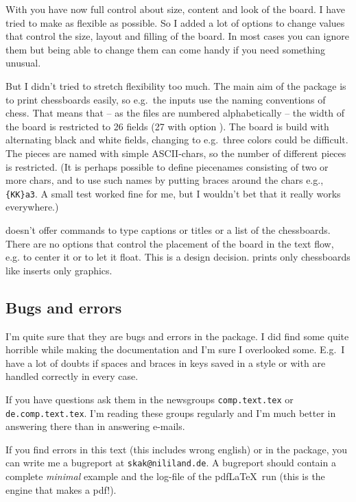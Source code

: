 \documentclass[pagesize,parskip=half-,fontsize=12pt]{scrartcl}
\begin{document}
With \pchessboard you have now full control about size, content and
look of the board. I have tried to make  as flexible
as possible. So I added a lot of options to change values that
control the size, layout and filling of the board. In most cases you
can ignore them but being able to change them can come handy if you
need something unusual.

But I didn't tried to stretch flexibility too much. The main aim of
the package is to print chessboards easily, so e.g.\ the inputs use
the naming conventions of chess. That means that -- as the files are
numbered alphabetically -- the width of the board is restricted to 26
fields (27 with option ). The board is build with
alternating black and white fields, changing to e.g.\ three colors
could be difficult. The pieces are named with simple ASCII-chars, so
the number of different pieces is restricted. (It is perhaps possible
to define piecenames consisting of two or more chars, and to use such
names by putting braces around the chars e.g.,
\verb+{KK}a3+.  A small test worked fine for me, but I wouldn't bet
that it really works everywhere.)

 \Pchessboard doesn't offer commands to type
captions or titles or a list of the chessboards. There are no options
that control the placement of the board in the text flow, e.g. to
center it or to let it float. This is a design decision.
 prints only chessboards like 
inserts only graphics.



\subsection{Bugs and errors}

I'm quite sure that they are bugs and errors in the package. I did
find some quite horrible while making the documentation and I'm sure
I overlooked some. E.g.\ I have a lot of doubts if spaces and braces
in keys saved in a style or with  are handled
correctly in every case.

If you have questions ask them in the newsgroups
\nolinkurl{comp.text.tex} or
\nolinkurl{de.comp.text.tex}. I'm reading these groups regularly and
I'm much better in answering there than in answering e-mails.


If you find errors in this text  (this includes wrong english) or in
the package, you can write me a bugreport at
\nolinkurl{skak@nililand.de}. A bugreport should contain a complete \emph{minimal}
example and the log-file of the pdf\LaTeX\ run (this is the engine
that makes a pdf!).
\end{document}
